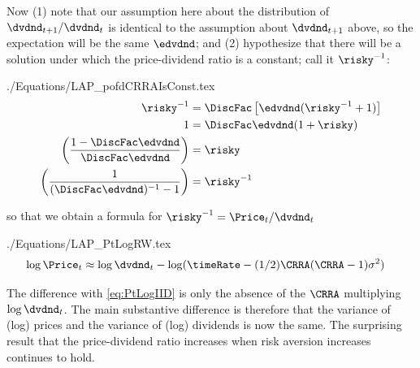 \documentclass{handout}
\begin{document}
Now (1) note that our assumption here about the distribution of $\dvdnd_{t+1}/\dvdnd_{t}$ is identical to the assumption about $\dvdnd_{t+1}$ above, so the expectation will be the same $\edvdnd$; and (2) hypothesize that there will be a solution under which the price-dividend ratio is a constant; call it $\risky^{-1}$:  
\begin{verbatimwrite}{./Equations/LAP_pofdCRRAIsConst.tex}
\begin{equation}\begin{gathered}\begin{aligned}
\risky^{-1}  & =   \DiscFac  \left[\edvdnd(\risky^{-1}+1)\right] 
\\ 1 & =  \DiscFac \edvdnd (1+\risky)
\\ \left(\frac{1-\DiscFac \edvdnd}{\DiscFac \edvdnd}\right)  & =  \risky
\\ \left(\frac{1}{(\DiscFac \edvdnd)^{-1}-1}\right)  & =  \risky^{-1}
\end{aligned}\end{gathered}\end{equation}
\end{verbatimwrite}

so that we obtain a formula for $\risky^{-1} = \Price_{t}/\dvdnd_{t}$
\begin{verbatimwrite}{./Equations/LAP_PtLogRW.tex}
\begin{equation}\begin{gathered}\begin{aligned}
  \log \Price_{t} & \approx  \log \dvdnd_{t}  - \log (\timeRate -  (1/2)\CRRA (\CRRA-1) \sigma^{2})\label{eq:PtLogRW}
\end{aligned}\end{gathered}\end{equation}
\end{verbatimwrite}


The difference with \eqref{eq:PtLogIID} is only the absence of the $\CRRA$ multiplying $\log \dvdnd_{t}$.  The main substantive difference is therefore that the variance of (log) prices and the variance of (log) dividends is now the same.  The surprising result that the price-dividend ratio increases when risk aversion increases continues to hold.
\end{document}
